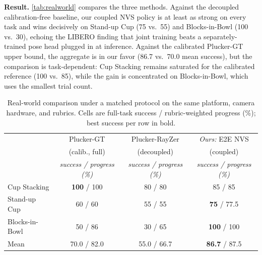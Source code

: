 \textbf{Result.} \autoref{tab:realworld} compares the three methods. Against the decoupled calibration-free baseline, our coupled NVS policy is at least as strong on every task and wins decisively on Stand-up Cup (75 vs.\ 55) and Blocks-in-Bowl (100 vs.\ 30), echoing the LIBERO finding that joint training beats a separately-trained pose head plugged in at inference. Against the calibrated Plucker-GT upper bound, the aggregate is in our favor (86.7 vs.\ 70.0 mean success), but the comparison is task-dependent: Cup Stacking remains saturated for the calibrated reference (100 vs.\ 85), while the gain is concentrated on Blocks-in-Bowl, which uses the smallest trial count.

\begin{table}[t]
  \centering
  \caption{Real-world comparison under a matched protocol on the same platform,
  camera hardware, and rubrics. Cells are full-task success / rubric-weighted progress
  (\%); best success per row in bold.}
  \label{tab:realworld}
  \begin{tabular}{lccc}
    \toprule
     & Plucker-GT & Plucker-RayZer & \textit{Ours:} E2E NVS \\
         & (calib., full) & (decoupled) & (coupled) \\
         & \textit{\tiny success / progress (\%)} & \textit{\tiny success / progress (\%)}& \textit{\tiny success / progress (\%)} \\
    \midrule
    Cup Stacking    & \textbf{100} / 100 & 80 / 80 & 85 / 85 \\
    Stand-up Cup    & 60 / 60 & 55 / 55 & \textbf{75} / 77.5 \\
    Blocks-in-Bowl  & 50 / 86 & 30 / 65 & \textbf{100} / 100 \\
    \midrule
    Mean            & 70.0 / 82.0 & 55.0 / 66.7 & \textbf{86.7} / 87.5 \\
    \bottomrule
  \end{tabular}
\end{table}
